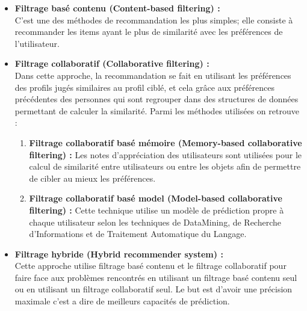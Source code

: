     \begin{itemize}
        \item \textbf{Filtrage basé contenu (Content-based filtering) :\\}
        C'est une des méthodes de recommandation les plus simples; elle consiste à recommander les items ayant le plus de similarité avec les préférences de l'utilisateur.\\

        \item \textbf{Filtrage collaboratif (Collaborative filtering) :\\}
        Dans cette approche, la recommandation se fait en utilisant les préférences des profils jugés similaires au profil ciblé, et cela grâce aux préférences précédentes des personnes qui sont regrouper dans des structures de données permettant de calculer la similarité. Parmi les méthodes utilisées on retrouve :
            \begin{enumerate}
                \item \textbf{Filtrage collaboratif basé mémoire (Memory-based collaborative filtering) : }Les notes d'appréciation des utilisateurs sont utilisées pour le calcul de similarité entre utilisateurs ou entre les objets afin de permettre de cibler au mieux les préférences.\\
                \item \textbf{Filtrage collaboratif basé model (Model-based collaborative filtering) : }Cette technique utilise un modèle de prédiction propre à chaque utilisateur selon les techniques de DataMining, de Recherche d'Informations et de Traitement Automatique du Langage.\\
            \end{enumerate}

        \item \textbf{Filtrage hybride (Hybrid recommender system) :\\}
        Cette approche utilise filtrage basé contenu et le filtrage collaboratif pour faire face aux problèmes rencontrés en utilisant un filtrage basé contenu seul ou en utilisant un filtrage collaboratif seul. Le but est d'avoir une précision maximale c'est a dire de meilleurs capacités de prédiction.\cite{filtering}
    \end{itemize}

